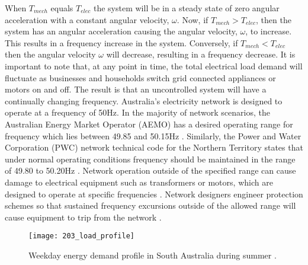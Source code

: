 When $T_{mech}$ equals $T_{elec}$ the system will be in a steady state of zero angular acceleration with a constant angular velocity, $\omega$. Now, if $T_{mech} > T_{elec}$, then the system has an angular acceleration causing the angular velocity, $\omega$, to increase. This results in a frequency increase in the system. Conversely, if $T_{mech} < T_{elec}$ then the angular velocity $\omega$ will decrease, resulting in a frequency decrease. It is important to note that, at any point in time, the total electrical load demand will fluctuate as businesses and households switch grid connected appliances or motors on and off. The result is that an uncontrolled system will have a continually changing frequency. Australia's electricity network is designed to operate at a frequency of 50$\si{\hertz}$. In the majority of network scenarios, the Australian Energy Market Operator (AEMO) has a desired operating range for frequency which lies between 49.85 and 50.15$\si{\hertz}$ \cite{AEMOfreqdev}. Similarly, the Power and Water Corporation (PWC) network technical code for the Northern Territory states that under normal operating conditions frequency should be maintained in the range of 49.80 to 50.20$\si{\hertz}$ \cite{Pwc2013}. Network operation outside of the specified range can cause damage to electrical equipment such as transformers or motors, which are designed to operate at specific frequencies \cite{Sen2014}. Network designers engineer protection schemes so that sustained frequency excursions outside of the allowed range will cause equipment to trip from the network \cite{AEMOpowerfreqriskrev}.

\begin{figure}[ht]
	\centering
	\texttt{[image: 203\_load\_profile]}
	\caption[Intraday load demand profile]{Weekday energy demand profile in South Australia during summer \cite{Aemosaenergyrep}.}
	\label{fig:203_load_profile}
\end{figure}

\newpage

